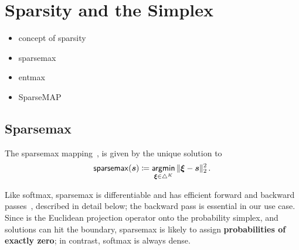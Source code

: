\section{Sparsity and the Simplex}
\label{sec:sparsity_background}


\begin{itemize}
    \item concept of sparsity
    \item sparsemax
    \item entmax
    \item SparseMAP
\end{itemize}


\subsection{Sparsemax}\label{sec:sparsemax_bg}

The sparsemax mapping~\citep{martins2016softmax}, is given by the unique solution to
\begin{equation}\label{eq:sparsemax}
    \operatorname*{\mathsf{sparsemax}}(\bm{s}) \coloneqq \operatorname*{\mathsf{argmin}}_{\bm{\xi} \in \triangle^K} \| \bm{\xi} - \bm{s} \|_2^2\,.
\end{equation}

Like softmax, sparsemax is differentiable and has efficient forward and backward
passes~\citep{Held1974,martins2016softmax}, described in detail below;
the backward pass is essential in our use case. Since
 is the Euclidean projection operator onto the probability
simplex, and solutions can hit the boundary, sparsemax is likely to assign {\bf
        probabilities of exactly zero}; in contrast, softmax is always dense.

